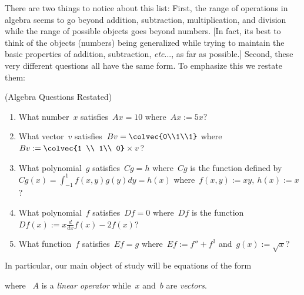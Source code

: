 \noindent
There are two things to notice about  this list: First,  the range of operations in algebra seems to go beyond addition, subtraction, multiplication, and division while the range of possible objects goes beyond numbers. [In fact, its best to think of the objects (numbers) being generalized while trying to maintain
the basic properties of addition, subtraction, {\it etc}..., as far as possible.]
Second, these very different questions all have the same form. To emphasize this we restate them:
\begin{example} (Algebra \hypertarget{AandD}{Questions} Restated) \\[-.5cm]
\begin{enumerate}
\item 
What 
number~$x$ satisfies~$Ax=10$ where~$Ax:=5x?$\\[-.6cm]
\item What vector~$v$ satisfies~$Bv = \colvec{0\\1\\1}$%
where ~$Bv:=\colvec{1 \\ 1\\ 0} \times v$?\\[-.4cm]
\item  What polynomial~$g$ satisfies~$Cg=h$ where~$Cg$ is the function defined by \\[.3cm]
$Cg(x)=\int_{-1}^1 f(x,y)g(y) dy = h(x)$ where~$f(x,y):=xy,~h(x):=x$?\\[-.5cm]
\item What polynomial~$f$ satisfies~$Df=0$ 
where~$Df$ is the function \\[.3cm]
$Df(x):=x\frac{d}{dx}f(x)-2f(x)$?\\[-5mm]
\item What function~$f$ satisfies~$Ef=g$ where~$Ef:=f''+f^3$ and~$g(x):=\sqrt{x}$?
\end{enumerate}
\end{example}
\noindent
In particular, 
our main object of study will be equations of the form
\begin{center}
\end{center}
where ~$A$ is a {\it linear operator} while~$x$ and~$b$ are {\it vectors}.


